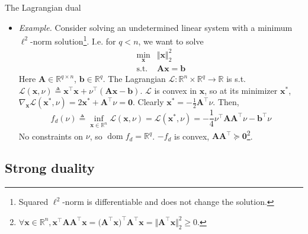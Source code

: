 \documentclass{beamer}
\numberwithin{equation}{section}
\begin{document}
\begin{frame}{The Lagrangian dual}
    \begin{itemize}
        \item
        \textit{Example.} Consider solving an undetermined linear system with
        a minimum $ \ell^2 $-norm solution\footnote{
            Squared $ \ell^2 $-norm is differentiable and does not change the
            solution.
        }. I.e. for $ q < n $, we want to
        solve
        \begin{equation*}
            \begin{array}{ll}
                \displaystyle\min_\mathbf{x} & \Vert\mathbf{x}\Vert_2^2 \\
                \text{s.t.} & \mathbf{Ax} = \mathbf{b}
            \end{array}
        \end{equation*}
        Here $ \mathbf{A} \in \mathbb{R}^{q \times n} $, $ \mathbf{b} \in
        \mathbb{R}^q $. The Lagrangian $ \mathcal{L} : \mathbb{R}^n \times
        \mathbb{R}^q \rightarrow \mathbb{R} $ is s.t.
        $ \mathcal{L}(\mathbf{x}, \nu) \triangleq \mathbf{x}^\top\mathbf{x} 
        + \nu^\top(\mathbf{Ax} - \mathbf{b}) $. $ \mathcal{L} $ is convex in
        $ \mathbf{x} $, so at its minimizer $ \mathbf{x}^* $,
        $ \nabla_\mathbf{x}\mathcal{L}(\mathbf{x}^*, \nu) =
        2\mathbf{x}^* + \mathbf{A}^\top\nu = \mathbf{0} $. Clearly
        $ \mathbf{x}^* = -\frac{1}{2}\mathbf{A}^\top\nu $. Then,
        \begin{equation*}
            f_d(\nu) \triangleq \inf_{\mathbf{x} \in \mathbb{R}^n}
                \mathcal{L}(\mathbf{x}, \nu) = \mathcal{L}(\mathbf{x}^*, \nu) =
                -\frac{1}{4}\nu^\top\mathbf{AA}^\top\nu - \mathbf{b}^\top\nu
        \end{equation*}
        No constraints on $ \nu $, so $ \operatorname{dom}f_d = \mathbb{R}^q $.
        $ -f_d $ is convex, $ \mathbf{AA}^\top \succeq
        \mathbf{0} $\footnote{
            $ \forall \mathbf{x} \in \mathbb{R}^n,
            \mathbf{x}^\top\mathbf{AA}^\top\mathbf{x} =
            \big(\mathbf{A}^\top\mathbf{x}\big)^\top\mathbf{A}^\top\mathbf{x} =
            \Vert\mathbf{A}^\top\mathbf{x}\Vert_2^2 \ge 0 $.
        }.
    \end{itemize}

    \medskip
\end{frame}

\subsection{Strong duality}
\end{document}
